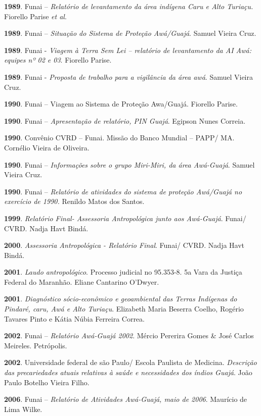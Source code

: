 \textbf{1989}. Funai -- \emph{Relatório de levantamento da área indígena
Caru e Alto Turiaçu.} Fiorello Parise \emph{et al}.

\textbf{1989}. Funai -- \emph{Situação do Sistema de Proteção
Awá/Guajá}. Samuel Vieira Cruz.

\textbf{1989}. Funai - \emph{Viagem à Terra Sem Lei -- relatório de
levantamento da AI Awá: equipes nº 02 e 03}. Fiorello Parise.

\textbf{1989}. Funai - \emph{Proposta de trabalho para a vigilância da
área awá}. Samuel Vieira Cruz.

\textbf{1990}. Funai -- Viagem ao Sistema de Proteção Awa/Guajá.
Fiorello Parise.

\textbf{1990}. Funai -- \emph{Apresentação de relatório, PIN Guajá}.
Egipson Nunes Correia.

\textbf{1990}. Convênio CVRD -- Funai. Missão do Banco Mundial -- PAPP/
MA. Cornélio Vieira de Oliveira.

\textbf{1990}. Funai -- \emph{Informações sobre o grupo Miri-Miri, da
área Awá-Guajá}. Samuel Vieira Cruz.

\textbf{1990}. Funai -- \emph{Relatório de atividades do sistema de
proteção Awá/Guajá no exercício de 1990.} Renildo Matos dos Santos.

\textbf{1999}. \emph{Relatório Final- Assessoria Antropológica junto aos
Awá-Guajá}. Funai/ CVRD. Nadja Havt Bindá.

\textbf{2000}. \emph{Assessoria Antropológica - Relatório Final}. Funai/
CVRD. Nadja Havt Bindá.

\textbf{2001}. \emph{Laudo antropológico}. Processo judicial no
95.353-8. 5a Vara da Justiça Federal do Maranhão. Eliane Cantarino
O'Dwyer.

\textbf{2001}. \emph{Diagnóstico sócio-econômico e geoambiental das
Terras Indígenas do Pindaré, caru, Awá e Alto Turiaçu}. Elizabeth Maria
Beserra Coelho, Rogério Tavares Pinto e Kátia Núbia Ferreira Correa.

\textbf{2002}. Funai -- \emph{Relatório Awá-Guajá 2002}. Mércio Pererira
Gomes \& José Carlos Meireles. Petrópolis.

\textbf{2002}. Universidade federal de são Paulo/ Escola Paulista de
Medicina. \emph{Descrição das precariedades atuais relativas à saúde e
necessidades dos índios Guajá}. João Paulo Botelho Vieira Filho.

\textbf{2006}. Funai -- \emph{Relatório de Atividades Awá-Guajá, maio de
2006}. Maurício de Lima Wilke.

